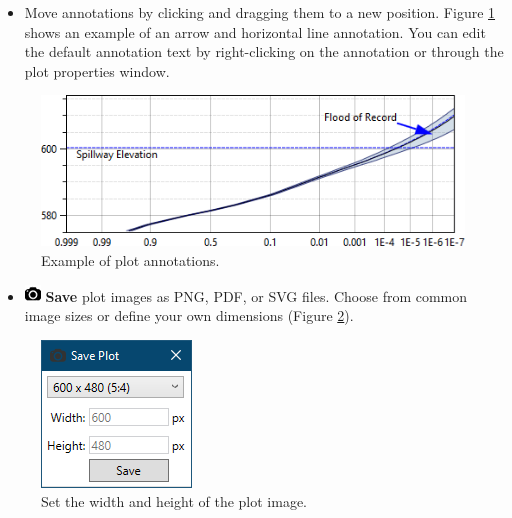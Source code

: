 \documentclass[
]{book}
\providecommand{\tightlist}{%
  \setlength{\itemsep}{0pt}\setlength{\parskip}{0pt}}
\begin{document}
\begin{itemize}
\tightlist
\item
  Move annotations by clicking and dragging them to a new position. Figure \ref{fig:figure-42} shows an example of an arrow and horizontal line annotation. You can edit the default annotation text by right-clicking on the annotation or through the plot properties window.
\end{itemize}

\begin{figure}

{\centering \includegraphics{images/figure42} 

}

\caption{Example of plot annotations.}\label{fig:figure-42}
\end{figure}

\begin{itemize}
\tightlist
\item
  \includegraphics{images/saveplot.png} \textbf{Save} plot images as PNG, PDF, or SVG files. Choose from common image sizes or define your own dimensions (Figure \ref{fig:figure-43}).
\end{itemize}

\begin{figure}

{\centering \includegraphics{images/figure43} 

}

\caption{Set the width and height of the plot image.}\label{fig:figure-43}
\end{figure}
\end{document}
